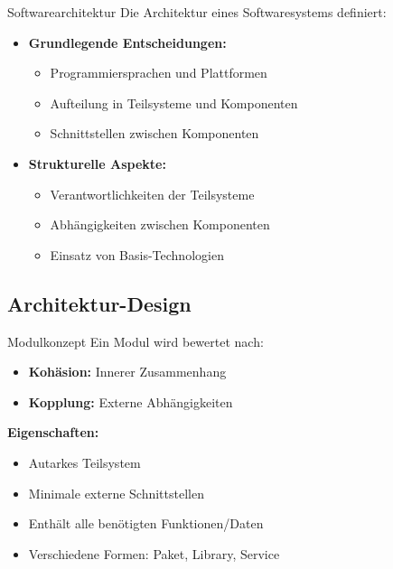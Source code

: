\begin{definition}{Softwarearchitektur}
Die Architektur eines Softwaresystems definiert:
\begin{itemize}
    \item \textbf{Grundlegende Entscheidungen:}
    \begin{itemize}
        \item Programmiersprachen und Plattformen
        \item Aufteilung in Teilsysteme und Komponenten
        \item Schnittstellen zwischen Komponenten
    \end{itemize}
    
    \item \textbf{Strukturelle Aspekte:}
    \begin{itemize}
        \item Verantwortlichkeiten der Teilsysteme
        \item Abhängigkeiten zwischen Komponenten
        \item Einsatz von Basis-Technologien
    \end{itemize}
\end{itemize}
\end{definition}

\subsection{Architektur-Design}

\begin{concept}{Modulkonzept}
Ein Modul wird bewertet nach:
\begin{itemize}
    \item \textbf{Kohäsion:} Innerer Zusammenhang
    \item \textbf{Kopplung:} Externe Abhängigkeiten
\end{itemize}

\textbf{Eigenschaften:}
\begin{itemize}
    \item Autarkes Teilsystem
    \item Minimale externe Schnittstellen
    \item Enthält alle benötigten Funktionen/Daten
    \item Verschiedene Formen: Paket, Library, Service
\end{itemize}
\end{concept}

